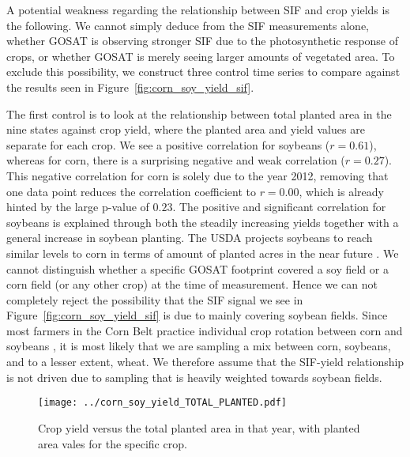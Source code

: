 \documentclass[preprint, a4paper, 10pt, times]{elsarticle}
\begin{document}
A potential weakness regarding the relationship between SIF and crop yields is the following. We cannot simply deduce from the SIF measurements alone, whether GOSAT is observing stronger SIF due to the photosynthetic response of crops, or whether GOSAT is merely seeing larger amounts of vegetated area. To exclude this possibility, we construct three control time series to compare against the results seen in Figure~\ref{fig:corn_soy_yield_sif}.

The first control is to look at the relationship between total planted area in the nine states against crop yield, where the planted area and yield values are separate for each crop. We see a positive correlation for soybeans ($r = 0.61$), whereas for corn, there is a surprising negative and weak correlation ($r = 0.27$). This negative correlation for corn is solely due to the year 2012, removing that one data point reduces the correlation coefficient to $r = 0.00$, which is already hinted by the large p-value of $0.23$. The positive and significant correlation for soybeans is explained through both the steadily increasing yields together with a general increase in soybean planting. The USDA projects soybeans to reach similar levels to corn in terms of amount of planted acres in the near future \citep{USDA-prognosis}. We cannot distinguish whether a specific GOSAT footprint covered a soy field or a corn field (or any other crop) at the time of measurement. Hence we can not completely reject the possibility that the SIF signal we see in Figure~\ref{fig:corn_soy_yield_sif} is due to mainly covering soybean fields. Since most farmers in the Corn Belt practice individual crop rotation between corn and soybeans \citep{suyker2012gross}, it is most likely that we are sampling a mix between corn, soybeans, and to a lesser extent, wheat. We therefore assume that the SIF-yield relationship is not driven due to sampling that is heavily weighted towards soybean fields.
 
\begin{figure}[htbp]
\centering
\texttt{[image: ../corn\_soy\_yield\_TOTAL\_PLANTED.pdf]}
\caption{Crop yield versus the total planted area in that year, with planted area vales for the specific crop.}
\label{fig:corn_soy_yield_TOTAL_PLANTED}
\end{figure}
\end{document}
